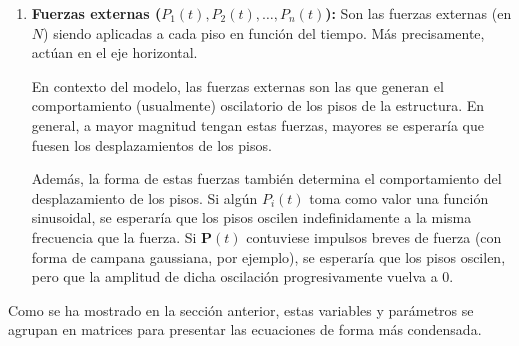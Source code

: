 \begin{enumerate}
    \item \textbf{Fuerzas externas (\(P_1(t), P_2(t), \ldots, P_n(t)\)):} Son las fuerzas externas (en \(\si{N}\)) siendo aplicadas a cada piso en función del tiempo. Más precisamente, actúan en el eje horizontal.

        En contexto del modelo, las fuerzas externas son las que generan el comportamiento (usualmente) oscilatorio de los pisos de la estructura. En general, a mayor magnitud tengan estas fuerzas, mayores se esperaría que fuesen los desplazamientos de los pisos.

        Además, la forma de estas fuerzas también determina el comportamiento del desplazamiento de los pisos. Si algún \(P_i(t)\) toma como valor una función sinusoidal, se esperaría que los pisos oscilen indefinidamente a la misma frecuencia que la fuerza. Si \(\mathbf{P}(t)\) contuviese impulsos breves de fuerza (con forma de campana gaussiana, por ejemplo), se esperaría que los pisos oscilen, pero que la amplitud de dicha oscilación progresivamente vuelva a 0.

\end{enumerate}

Como se ha mostrado en la sección anterior, estas variables y parámetros se agrupan en matrices para presentar las ecuaciones de forma más condensada.

